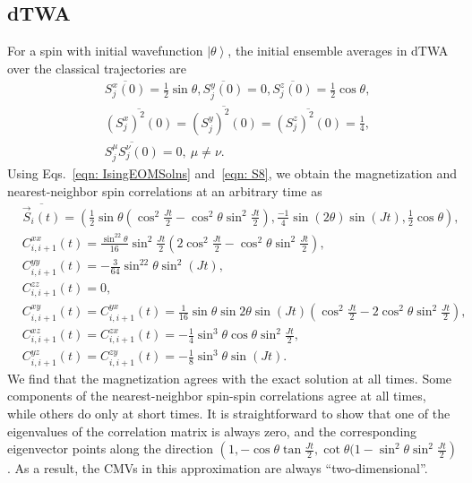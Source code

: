 \documentclass[pra,reprint,superscriptaddress]{revtex4-1}
\newcommand{\ket}[1]{\left| #1 \right\rangle}
\begin{document}
\begin{widetext}
\subsection{dTWA}
For a spin with initial wavefunction $\ket{\theta}$, the initial ensemble averages in dTWA over the classical trajectories are
\begin{align}\label{eqn: S8}
&\overline{S^x_j(0)} = \frac{1}{2}\sin\theta, \overline{S^y_j(0)} = 0, \overline{S^z_j(0)} = \frac{1}{2}\cos\theta,\nonumber\\
&\overline{\left(S^x_j\right)^2(0)} = \overline{\left(S^y_j\right)^2(0)} = \overline{\left(S^z_j\right)^2(0)} = \frac{1}{4},\nonumber\\
&\overline{S^\mu_jS^\nu_j(0)} = 0,\ \mu\neq\nu.
\end{align}
Using Eqs.~\eqref{eqn: IsingEOMSolns} and~\eqref{eqn: S8}, we obtain the magnetization and nearest-neighbor spin correlations at an arbitrary time as
\begin{align}
&\overline{\vec{S}_i(t)} = \left(\frac{1}{2}\sin\theta\left(\cos^2\frac{Jt}{2}-\cos^2\theta\sin^2\frac{Jt}{2}\right), \frac{-1}{4}\sin(2\theta)\sin(Jt), \frac{1}{2}\cos\theta\right), \nonumber\\
&C^{xx}_{i,i+1}(t) = \frac{\sin^22\theta}{16}\sin^2\frac{Jt}{2} \left(2\cos^2\frac{Jt}{2}-\cos^2\theta\sin^2\frac{Jt}{2}\right),\nonumber\\
&C^{yy}_{i,i+1}(t) = -\frac{3}{64}\sin^22\theta\sin^2(Jt),\nonumber\\
&C^{zz}_{i,i+1}(t) = 0, \nonumber\\
&C^{xy}_{i,i+1}(t) = C^{yx}_{i,i+1}(t) = \frac{1}{16}\sin\theta\sin2\theta\sin(Jt) \left(\cos^2\frac{Jt}{2}-2\cos^2\theta\sin^2\frac{Jt}{2}\right), \nonumber\\
&C^{xz}_{i,i+1}(t) = C^{zx}_{i,i+1}(t) = -\frac{1}{4}\sin^3\theta\cos\theta\sin^2\frac{Jt}{2},\nonumber\\
&C^{yz}_{i,i+1}(t) = C^{zy}_{i,i+1}(t) = -\frac{1}{8}\sin^3\theta\sin(Jt).
\end{align}
We find that the magnetization agrees with the exact solution at all times. Some components of the nearest-neighbor spin-spin correlations agree at all times, while others do only at short times. It is straightforward to show that one of the eigenvalues of the correlation matrix is always zero, and the corresponding eigenvector points along the direction $\left(1,-\cos\theta\tan\frac{Jt}{2}, \cot\theta(1-\sin^2\theta\sin^2\frac{Jt}{2}\right)$. As a result, the CMVs in this approximation are always ``two-dimensional''.


\end{widetext}
\end{document}

